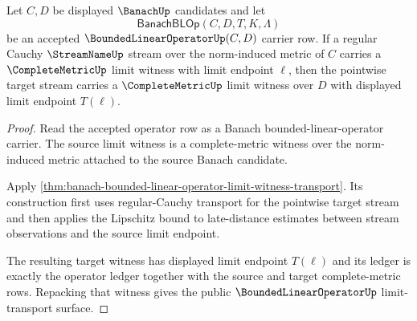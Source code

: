 \begin{theorem}
\label{thm:bounded-linear-operator-limit-transport}
Let $C,D$ be displayed $\BanachUp$ candidates and let
$$
\mathsf{BanachBLOp}(C,D,T,K,\Lambda)
$$
be an accepted $\BoundedLinearOperatorUp(C,D)$ carrier row. If a regular Cauchy $\StreamNameUp$ stream over the norm-induced metric of $C$ carries a $\CompleteMetricUp$ limit witness with limit endpoint $\ell$, then the pointwise target stream carries a $\CompleteMetricUp$ limit witness over $D$ with displayed limit endpoint $T(\ell)$.
\end{theorem}
\begin{proof}
Read the accepted operator row as a Banach bounded-linear-operator carrier. The source limit witness is a complete-metric witness over the norm-induced metric attached to the source Banach candidate.

Apply \autoref{thm:banach-bounded-linear-operator-limit-witness-transport}. Its construction first uses regular-Cauchy transport for the pointwise target stream and then applies the Lipschitz bound to late-distance estimates between stream observations and the source limit endpoint.

The resulting target witness has displayed limit endpoint $T(\ell)$ and its ledger is exactly the operator ledger together with the source and target complete-metric rows. Repacking that witness gives the public $\BoundedLinearOperatorUp$ limit-transport surface.
\end{proof}

